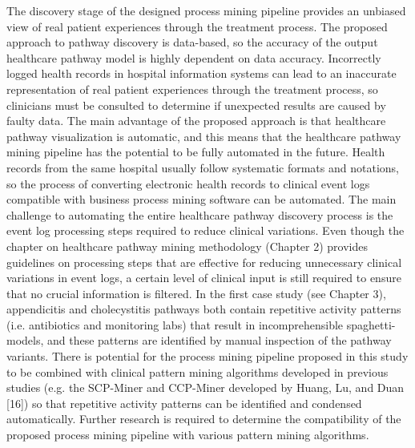 The discovery stage of the designed process mining pipeline provides an unbiased view of real patient experiences through the treatment process. The proposed approach to pathway discovery is data-based, so the accuracy of the output healthcare pathway model is highly dependent on data accuracy. Incorrectly logged health records in hospital information systems can lead to an inaccurate representation of real patient experiences through the treatment process, so clinicians must be consulted to determine if unexpected results are caused by faulty data. The main advantage of the proposed approach is that healthcare pathway visualization is automatic, and this means that the healthcare pathway mining pipeline has the potential to be fully automated in the future. Health records from the same hospital usually follow systematic formats and notations, so the process of converting electronic health records to clinical event logs compatible with business process mining software can be automated. The main challenge to automating the entire healthcare pathway discovery process is the event log processing steps required to reduce clinical variations. Even though the chapter on healthcare pathway mining methodology (Chapter 2) provides guidelines on processing steps that are effective for reducing unnecessary clinical variations in event logs, a certain level of clinical input is still required to ensure that no crucial information is filtered. In the first case study (see Chapter 3), appendicitis and cholecystitis pathways both contain repetitive activity patterns (i.e. antibiotics and monitoring labs) that result in incomprehensible spaghetti-models, and these patterns are identified by manual inspection of the pathway variants. There is potential for the process mining pipeline proposed in this study to be combined with clinical pattern mining algorithms developed in previous studies (e.g. the SCP-Miner and CCP-Miner developed by Huang, Lu, and Duan [16]) so that repetitive activity patterns can be identified and condensed automatically. Further research is required to determine the compatibility of the proposed process mining pipeline with various pattern mining algorithms.


